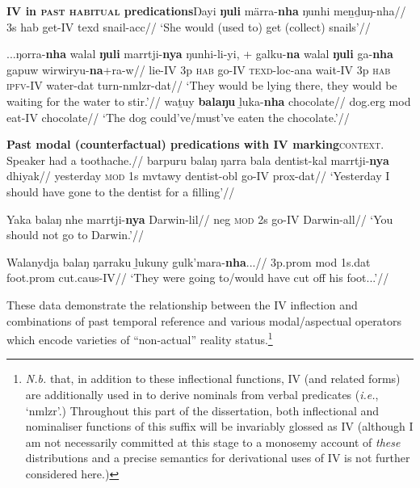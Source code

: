 \pex\textbf{\gls{IV} in \textsc{past habitual} predications}\a{}\begingl\gla Ŋayi \textbf{ŋuli} märra-\textbf{nha} ŋunhi meṉḏuŋ-nha//
\glb 3s \gls{hab} get-\gls{IV} \gls{texd} snail-\gls{acc}//
\glft`She would (used to) get (collect) snails'//\endgl

\a\begingl\gla ...ŋorra-\textbf{nha} walal \textbf{ŋuli} marrtji-\textbf{nya} ŋunhi-li-yi, + galku-\textbf{na} walal \textbf{ŋuli} ga-\textbf{nha} gapuw wirwiryu-\textbf{na}+ra-w//
\glb lie-\gls{IV} 3p \textsc{hab} go-\gls{IV} \textsc{texd}-\gls{loc}-\gls{ana} wait-\gls{IV} 3p \textsc{hab} \textsc{ipfv}-\gls{IV} water-\gls{dat} turn-\gls{nmlzr}-\gls{dat}//
\glft`They would be lying there, they would be waiting for the water to stir.'//\endgl
\a\begingl\gla waṯuy \textbf{balaŋu} ḻuka-\textbf{nha} chocolate//
\glb dog.\gls{erg} \gls{mod} eat-\gls{IV} chocolate//
\glft`The dog could've/must've eaten the chocolate.'\trailingcitation{[DhG~20190413]}//\endgl

\xe

\pex\textbf{Past modal (counterfactual) predications with \gls{IV} marking}\a\begingl\glpreamble{}\textsc{context.} Speaker had a toothache.//
\gla barpuru balaŋ ŋarra bala dentist-kal marrtji-\textbf{nya} dhiyak//
\glb yesterday \textsc{mod} 1s \gls{mvtawy} dentist-\gls{obl} go-\gls{IV} \gls{prox}-\gls{dat}//
\glft`Yesterday I should have gone to the dentist for a filling'//\endgl

\a\begingl\gla Yaka balaŋ nhe marrtji-\textbf{nya} Darwin-lil//
\glb \gls{neg} \textsc{mod} 2s go-\gls{IV} Darwin-\gls{all}//
\glft`You should not go to Darwin.'//\endgl


\a\begingl\gla Walanydja balaŋ ŋarraku ḻukuny gulk'mara-\textbf{nha}...//
\glb 3p.\gls{prom} \gls{mod} 1s.\gls{dat} foot.\gls{prom} cut.\gls{caus}-\gls{IV}//
\glft `They were going to/would have cut off his foot...'\trailingcitation{[AW~20190422]}//
\endgl\xe


These data demonstrate the relationship between the \gls{IV} inflection and combinations of past temporal reference and various modal/aspectual operators which encode varieties of ``non-actual'' reality status.\footnote{\textit{N.b.} that, in addition to these inflectional functions, \gls{IV} (and related forms) are additionally used in to derive nominals from verbal predicates (\textit{i.e.}, `\gls{nmlzr}'.) Throughout this part of the dissertation, both inflectional and nominaliser functions of this suffix will be invariably glossed as \gls{IV} (although I am not necessarily committed at this stage to a monosemy account of \textit{these} distributions and a precise semantics for derivational uses of \gls{IV} is not further considered here.)}

